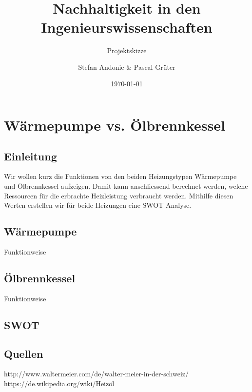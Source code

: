 \documentclass[09pt,paper=a4,final]{scrartcl}
\title{Nachhaltigkeit in den Ingenieurswissenschaften}
\subtitle{Projektskizze}
\author{Stefan Andonie \& Pascal Grüter}
\date{\today{}}
\begin{document}
\section*{Wärmepumpe vs. Ölbrennkessel}

\subsection*{Einleitung}

Wir wollen kurz die Funktionen von den beiden Heizungstypen Wärmepumpe und Ölbrennkessel aufzeigen. Damit kann anschliessend berechnet werden, welche Ressourcen für die erbrachte Heizleistung verbraucht werden. Mithilfe diesen Werten erstellen wir für beide Heizungen eine SWOT-Analyse.

\subsection*{Wärmepumpe}

Funktionweise

\subsection*{Ölbrennkessel}

Funktionweise

\subsection*{SWOT}


\subsection*{Quellen}

http://www.waltermeier.com/de/walter-meier-in-der-schweiz/ \\
https://de.wikipedia.org/wiki/Heizöl \\
\end{document}
